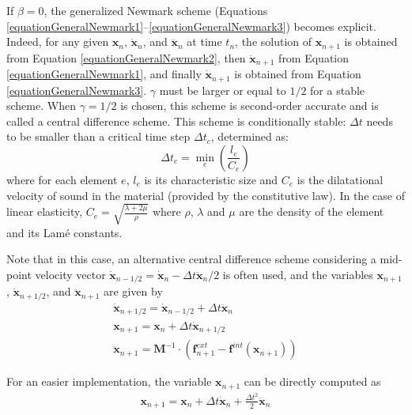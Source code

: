 \documentclass[oneside,11pt,times]{book}
\begin{document}
If $\beta = 0$, the generalized Newmark scheme (Equations \eqref{equationGeneralNewmark1}--\eqref{equationGeneralNewmark3}) becomes explicit. Indeed, for any given $\bm{x}_{n}$, $\dot{\bm{x}}_{n}$, and $\ddot{\bm{x}}_{n}$ at time $t_{n}$, the solution of $\bm{x}_{n+1}$ is obtained from Equation \eqref{equationGeneralNewmark2}, then $\ddot{\bm{x}}_{n+1}$ from Equation \eqref{equationGeneralNewmark1}, and finally $\dot{\bm{x}}_{n+1}$ is obtained from
Equation \eqref{equationGeneralNewmark3}. $\gamma$ must be larger or equal to $1/2$ for a stable scheme. When \hbox{$\gamma = 1/2$} is chosen, this scheme is second-order accurate and is called a central difference scheme. This scheme is conditionally stable: $\Delta t$ needs to be smaller than a critical time step $\Delta t_c$, determined as:
\begin{equation}
  \Delta t_c = \min_e{\left(\frac{l_e}{C_e}\right)}
\end{equation}
where for each element $e$, $l_e$ is its characteristic size and $C_e$ is the dilatational velocity of sound in the material (provided by the constitutive law). In the case of linear elasticity, $C_e=\sqrt{\frac{\lambda+2\mu}{\rho}}$ where $\rho$, $\lambda$ and $\mu$ are the density of the element and its Lam\'e constants.

Note that in this case, an alternative central difference scheme considering a mid-point velocity vector $\dot{\bm{x}}_{n-1/2} = \dot{\bm{x}}_{n} - \Delta t \ddot{\bm{x}}_{n}/2$ is often used, and the variables $\bm{x}_{n+1}$, $\dot{\bm{x}}_{n+1/2}$, and $\ddot{\bm{x}}_{n+1}$ are given by
%
\begin{eqnarray}
 & \displaystyle{\dot{\bm{x}}_{n+1/2} = \dot{\bm{x}}_{n-1/2} + \Delta t \ddot{\bm{x}}_{n}}  &
   \label{equationCentralDifference13} \\
 & \displaystyle{\bm{x}_{n+1} = \bm{x}_{n} + \Delta t \dot{\bm{x}}_{n+1/2}}  &
   \label{equationCentralDifference2} \\
 & \displaystyle{\ddot{\bm{x}}_{n+1} = \bm{M}^{-1}\cdot \left(\bm{f}^{ext}_{n+1} -
   \bm{f}^{int}(\bm{x}_{n+1})\right)} & \label{equationCentralDifference1}
\end{eqnarray}
%

For an easier implementation, the variable $\bm{x}_{n+1}$ can be directly computed as
%
\begin{eqnarray}
 & \displaystyle{\bm{x}_{n+1} = \bm{x}_{n} + \Delta t \dot{\bm{x}}_{n} + \frac{\Delta t^2}{2} \ddot{\bm{x}}_{n}}  &
   \label{equationCorrection}
\end{eqnarray}
%
\end{document}
